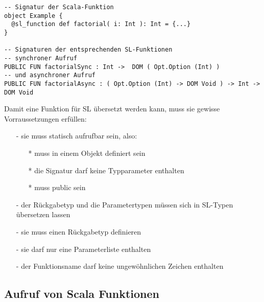 \documentclass[12pt]{scrreprt}
\begin{document}
\begin{lstlisting}[caption=Beispiel einer übersetzten Funktion, label=lst:example-signatur-translated-funktion, float]
-- Signatur der Scala-Funktion
object Example {
  @sl_function def factorial( i: Int ): Int = {...}
}

-- Signaturen der entsprechenden SL-Funktionen
-- synchroner Aufruf
PUBLIC FUN factorialSync : Int ->  DOM ( Opt.Option (Int) )
-- und asynchroner Aufruf
PUBLIC FUN factorialAsync : ( Opt.Option (Int) -> DOM Void ) -> Int ->  DOM Void

\end{lstlisting}

Damit eine Funktion für \ac{SL} übersetzt werden kann, muss sie gewisse Vorraussetzungen erfüllen:
\begin{itemize}
 \item[-]{sie muss statisch aufrufbar sein, also:}
 \begin{itemize}
  \item[*]{muss in einem Objekt definiert sein}
  \item[*]{die Signatur darf keine Typparameter enthalten}
  \item[*]{muss public sein}
 \end{itemize}
 \item[-]{der Rückgabetyp und die Parametertypen müssen sich in \ac{SL}-Typen übersetzen lassen}
 \item[-]{sie muss einen Rückgabetyp definieren}
 \item[-]{sie darf nur eine Parameterliste enthalten}
 \item[-]{der Funktionsname darf keine ungewöhnlichen Zeichen enthalten}
\end{itemize}



%




\subsection{Aufruf von Scala Funktionen}
\label{subs:call-scala-functions}

\end{document}
